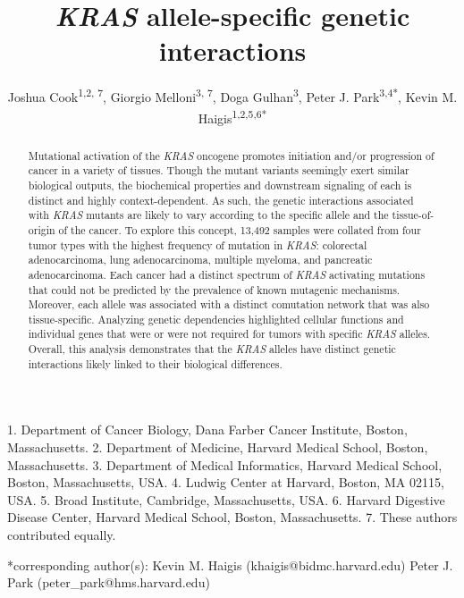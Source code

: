 \documentclass[english, 10pt, letterpaper]{article}
\title{\emph{KRAS} allele-specific genetic interactions}
\author{
    Joshua Cook\textsuperscript{1,2, 7},
    Giorgio Melloni\textsuperscript{3, 7}, 
    Doga Gulhan\textsuperscript{3}, 
    Peter J. Park\textsuperscript{3,4{*}}, 
    Kevin M. Haigis\textsuperscript{1,2,5,6{*}}
}
\newcommand{\KRAS}{\emph{KRAS}}
\begin{document}

\maketitle

\thispagestyle{fancy}

1. Department of Cancer Biology, Dana Farber Cancer Institute, Boston, Massachusetts.
2. Department of Medicine, Harvard Medical School, Boston, Massachusetts.
3. Department of Medical Informatics, Harvard Medical School, Boston, Massachusetts, USA.
4. Ludwig Center at Harvard, Boston, MA 02115, USA.
5. Broad Institute, Cambridge, Massachusetts, USA.
6. Harvard Digestive Disease Center, Harvard Medical School, Boston, Massachusetts.
7. These authors contributed equally.

{*}corresponding author(s):
\newline{} \hspace*{1cm} Kevin M. Haigis (khaigis@bidmc.harvard.edu)
\newline{} \hspace*{1cm} Peter J. Park (peter\_park@hms.harvard.edu)

\begin{abstract}
Mutational activation of the \KRAS{} oncogene promotes initiation and/or progression of cancer in a variety of tissues.
Though the mutant variants seemingly exert similar biological outputs, the biochemical properties and downstream signaling  of each is distinct and highly context-dependent.
As such, the genetic interactions associated with \KRAS{} mutants are likely to vary according to the specific allele and the tissue-of-origin of the cancer.
To explore this concept, 13,492 samples were collated from four tumor types with the highest frequency of mutation in \KRAS{}: colorectal adenocarcinoma, lung adenocarcinoma, multiple myeloma, and pancreatic adenocarcinoma.
Each cancer had a distinct spectrum of \KRAS{} activating mutations that could not be predicted by the prevalence of known mutagenic mechanisms.
Moreover, each allele was associated with a distinct comutation network that was also tissue-specific.
Analyzing genetic dependencies highlighted cellular functions and individual genes that were or were not required for tumors with specific \KRAS{} alleles.
Overall, this analysis demonstrates that the \KRAS{} alleles have distinct genetic interactions likely linked to their biological differences.
\end{abstract}
\end{document}
